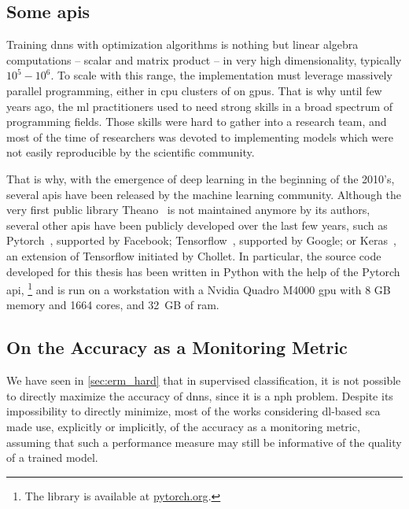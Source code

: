 \subsection{Some \glspl{api}}
\label{sec:apis}
Training \glspl{dnn} with optimization algorithms is nothing but linear algebra computations -- \eg{} scalar and matrix product -- in very high dimensionality, typically \(10^5 - 10^6\).
To scale with this range, the implementation must leverage massively parallel programming, either in \gls{cpu} clusters of on \glspl{gpu}.
That is why until few years ago, the \gls{ml} practitioners used to need strong skills in a broad spectrum of programming fields.
Those skills were hard to gather into a research team, and most of the time of researchers was devoted to implementing models which were not easily reproducible by the scientific community.

That is why, with the emergence of deep learning in the beginning of the 2010's, several \glspl{api} have been released by the machine learning community.
Although the very first public library \textsf{Theano}~\cite{theano} is not maintained anymore by its authors, several other \glspl{api} have been publicly developed over the last few years, such as \textsf{Pytorch}~\cite{pytorch_2019}, supported by Facebook; \textsf{Tensorflow}~\cite{tensorflow2015-whitepaper}, supported by Google; or \textsf{Keras}~\cite{chollet2015keras}, an extension of \textsf{Tensorflow} initiated by Chollet.
In particular, the source code developed for this thesis has been written in \textsf{Python} with the help of the \textsf{Pytorch} \gls{api},%
\footnote{The library is available at \url{pytorch.org}.}
and is run on a workstation with a \textsf{Nvidia Quadro M4000} \gls{gpu} with 8 GB memory and 1664 cores, and 32~GB of \gls{ram}.

\subsection{On the Accuracy as a Monitoring Metric}
\label{sec:issue_accuracy}
We have seen in \autoref{sec:erm_hard} that in supervised classification, it is not possible to directly maximize the accuracy of \glspl{dnn}, since it is a \gls{nph} problem.
Despite its impossibility to directly minimize, most of the works considering \gls{dl}-based \gls{sca} made use, explicitly or implicitly, of the accuracy as a monitoring metric, assuming that such a performance measure may still be informative of the quality of a trained model.

